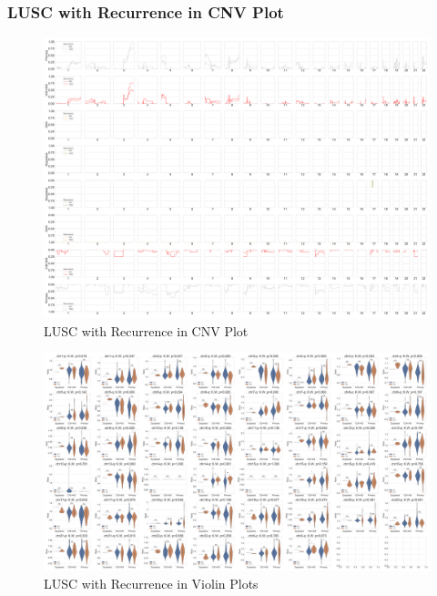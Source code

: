 \documentclass{beamer}
\begin{document}
    \begin{frame}[allowframebreaks]
        \frametitle{LUSC with Recurrence in CNV Plot}

        \begin{figure}
            \includegraphics[width=0.6 \linewidth]{figures/Sequenza/BWA-simple-SQC.Recurrence.pdf}
            \caption{LUSC with Recurrence in CNV Plot}
        \end{figure}

        \begin{figure}
            \includegraphics[width=0.8 \linewidth]{figures/Sequenza/BWA-violin-SQC.Recurrence.pdf}
            \caption{LUSC with Recurrence in Violin Plots}
        \end{figure}
    \end{frame}
\end{document}
